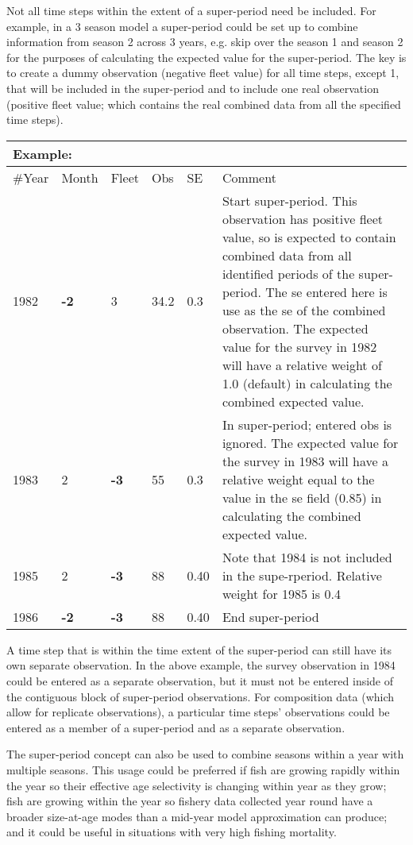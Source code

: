 Not all time steps within the extent of a super-period need be included.  For example, in a 3 season model a super-period could be set up to combine information from season 2 across 3 years, e.g. skip over the season 1 and season 2 for the purposes of calculating the expected value for the super-period.  The key is to create a dummy observation (negative fleet value) for all time steps, except 1, that will be included in the super-period and to include one real observation (positive fleet value; which contains the real combined data from all the specified time steps).

\begin{center}
	\begin{tabular}{p{1cm} p{1cm} p{1cm} p{1cm} p{1cm} p{9cm}}
		\multicolumn{6}{l}{Example:}\\
		\hline
		\#Year & Month & Fleet & Obs & SE & Comment \\
		\hline
		1982 & \textbf{-2} & 3 & 34.2 & 0.3 & Start super-period.  This observation has positive fleet value, so is expected to contain combined data from all identified periods of the super-period.  The se entered here is use as the se of the combined observation.  The expected value for the survey in 1982 will have a relative weight of 1.0 (default) in calculating the combined expected value.\\
		\hline
		1983 & 2 & \textbf{-3} & 55 & 0.3 & In super-period; entered obs is ignored.  The expected value for the survey in 1983 will have a relative weight equal to the value in the se field (0.85) in calculating the combined expected value.\\
		\hline
		1985 & 2 & \textbf{-3}& 88 & 0.40 & Note that 1984 is not included in the supe-rperiod.  Relative weight for 1985 is 0.4\\
		\hline
		1986 & \textbf{-2} & \textbf{-3} & 88 & 0.40 & End super-period\\
		\hline
	\end{tabular}
\end{center}

A time step that is within the time extent of the super-period can still have its own separate observation.  In the above example, the survey observation in 1984 could be entered as a separate observation, but it must not be entered inside of the contiguous block of super-period observations.  For composition data (which allow for replicate observations), a particular time steps' observations could be entered as a member of a super-period and as a separate observation.

The super-period concept can also be used to combine seasons within a year with multiple seasons.  This usage could be preferred if fish are growing rapidly within the year so their effective age selectivity is changing within year as they grow; fish are growing within the year so fishery data collected year round have a broader size-at-age modes than a mid-year model approximation can produce; and it could be useful in situations with very high fishing mortality.
